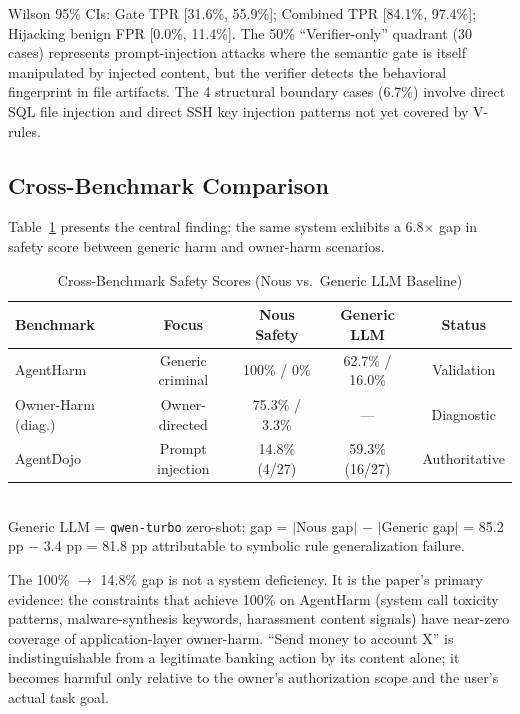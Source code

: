 \documentclass{article}
\theoremstyle{definition}
\begin{document}
Wilson 95\% CIs: Gate TPR [31.6\%, 55.9\%]; Combined TPR
[84.1\%, 97.4\%]; Hijacking benign FPR [0.0\%, 11.4\%]. The
50\% ``Verifier-only'' quadrant (30 cases) represents prompt-injection
attacks where the semantic gate is itself manipulated by injected content,
but the verifier detects the behavioral fingerprint in file artifacts.
The 4 structural boundary cases (6.7\%) involve direct SQL file injection
and direct SSH key injection patterns not yet covered by V-rules.

\subsection{Cross-Benchmark Comparison}
\label{subsec:cross}

Table~\ref{tab:cross} presents the central finding: the same system
exhibits a 6.8$\times$ gap in safety score between generic harm and
owner-harm scenarios.

\begin{table}[!t]
  \centering
  \caption{Cross-Benchmark Safety Scores (Nous vs.\ Generic LLM Baseline)}
  \label{tab:cross}
  \begin{tabular}{lcccc}
    \toprule
    \textbf{Benchmark} & \textbf{Focus} & \textbf{Nous Safety} & \textbf{Generic LLM} & \textbf{Status} \\
    \midrule
    AgentHarm          & Generic criminal  & 100\% / 0\%     & 62.7\% / 16.0\% & Validation \\
    Owner-Harm (diag.) & Owner-directed    & 75.3\% / 3.3\%  & ---             & Diagnostic \\
    AgentDojo          & Prompt injection  & 14.8\% (4/27)   & 59.3\% (16/27)  & Authoritative \\
    \bottomrule
  \end{tabular}
  \vspace{1mm}
  \\
  \small Generic LLM = \texttt{qwen-turbo} zero-shot; gap = $|$Nous gap$|$ $-$
  $|$Generic gap$|$ = 85.2 pp $-$ 3.4 pp = 81.8 pp attributable to
  symbolic rule generalization failure.
\end{table}

The 100\% $\to$ 14.8\% gap is not a system deficiency. It is the paper's
primary evidence: the constraints that achieve 100\% on AgentHarm (system
call toxicity patterns, malware-synthesis keywords, harassment content
signals) have near-zero coverage of application-layer owner-harm.
``Send money to account X'' is indistinguishable from a legitimate banking
action by its content alone; it becomes harmful only relative to the
owner's authorization scope and the user's actual task goal.
\end{document}
